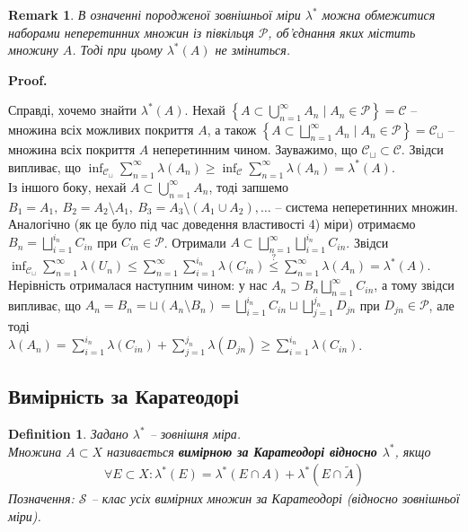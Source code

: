 \documentclass[a4paper, 10pt]{article}
\makeatletter
\theoremstyle{theoremdd}
\newtheorem{definition}[theorem]{Definition}
\newtheorem{remark}[theorem]{Remark}
\renewenvironment{proof}[1][Proof.\\]{\par
\pushQED{\hfill \qed}%
\normalfont \topsep6\p@\@plus6\p@\relax
\trivlist
\item\relax
{\bfseries
#1\@addpunct{.}}\hspace\labelsep\ignorespaces
}{%
\popQED\endtrivlist\@endpefalse
}
\makeatother
\begin{document}
\begin{remark}
В означенні породженої зовнішньої міри $\lambda^*$ можна обмежитися наборами неперетинних множин із півкільця $\mathcal{P}$, об'єднання яких містить множину $A$. Тоді при цьому $\lambda^*(A)$ не зміниться.
\end{remark}

\begin{proof}
Справді, хочемо знайти $\lambda^*(A)$. Нехай $\left\{ A \subset \displaystyle\bigcup_{n=1}^\infty A_n \mid A_n \in \mathcal{P}\right\} = \mathcal{C}$ -- множина всіх можливих покриття $A$, а також $\left\{ A \subset \displaystyle\bigsqcup_{n=1}^\infty A_n \mid A_n \in \mathcal{P}\right\} = \mathcal{C}_\sqcup$ -- множина всіх покриття $A$ неперетинним чином. Зауважимо, що $\mathcal{C}_{\sqcup} \subset \mathcal{C}$. Звідси випливає, що $\displaystyle\inf_{\mathcal{C}_{\sqcup}} \sum_{n=1}^\infty \lambda(A_n) \geq \displaystyle\inf_{\mathcal{C}} \sum_{n=1}^\infty \lambda(A_n) =\lambda^*(A)$.\\
Із іншого боку, нехай $A \subset \displaystyle\bigcup_{n=1}^\infty A_n$, тоді запшемо $B_1 = A_1,\ B_2 = A_2 \setminus A_1,\ B_3 = A_3 \setminus (A_1 \cup A_2), \dots$ -- система неперетинних множин. Аналогічно (як це було під час доведення властивості 4) міри) отримаємо $B_n = \displaystyle\bigsqcup_{i=1}^{i_n} C_{in}$ при $C_{in} \in \mathcal{P}$. Отримали $\displaystyle A \subset \bigsqcup_{n=1}^{\infty} \bigsqcup_{i=1}^{i_n} C_{in}$. Звідси\\
$\displaystyle\inf_{\mathcal{C}_{\sqcup}} \sum_{n=1}^\infty \lambda(U_n) \leq \sum_{n=1}^\infty \sum_{i=1}^{i_n} \lambda(C_{in}) \overset{?}{\leq} \sum_{n=1}^\infty \lambda(A_n) = \lambda^*(A)$.\\
Нерівність отрималася наступним чином: у нас $A_n \supset B_n \displaystyle\bigsqcup_{n=1}^\infty C_{in}$, а тому звідси випливає, що $\displaystyle A_n = B_n = \sqcup (A_n \setminus B_n) = \bigsqcup_{i=1}^{i_n} C_{in} \sqcup \bigsqcup_{j=1}^{j_n} D_{jn}$ при $D_{jn} \in \mathcal{P}$, але тоді\\
$\lambda(A_n) = \displaystyle\sum_{i=1}^{i_n} \lambda(C_{in}) + \sum_{j=1}^{j_n} \lambda(D_{jn}) \geq \sum_{i=1}^{i_n} \lambda(C_{in})$.
\end{proof}

\subsection{Вимірність за Каратеодорі}
\begin{definition}
Задано $\lambda^*$ -- зовнішня міра.\\
Множина $A \subset X$ називається \textbf{вимірною за Каратеодорі відносно $\lambda^*$}, якщо
\begin{align*}
\forall E \subset X: \lambda^*(E) = \lambda^*(E \cap A) + \lambda^*(E \cap \tilde{A})
\end{align*}
Позначення: $\mathcal{S}$ -- клас усіх вимірних множин за Каратеодорі (відносно зовнішньої міри).
\end{definition}
\end{document}
